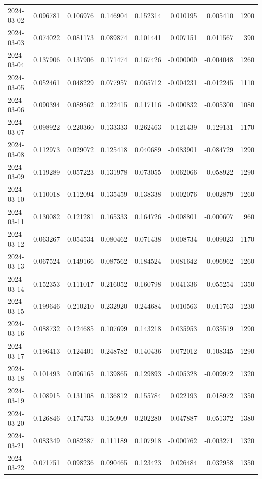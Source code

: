 \begin{tabular}{lrrrrrrr}
2024-03-02 & 0.096781 & 0.106976 & 0.146904 & 0.152314 & 0.010195 & 0.005410 & 1200 \\
2024-03-03 & 0.074022 & 0.081173 & 0.089874 & 0.101441 & 0.007151 & 0.011567 & 390 \\
2024-03-04 & 0.137906 & 0.137906 & 0.171474 & 0.167426 & -0.000000 & -0.004048 & 1260 \\
2024-03-05 & 0.052461 & 0.048229 & 0.077957 & 0.065712 & -0.004231 & -0.012245 & 1110 \\
2024-03-06 & 0.090394 & 0.089562 & 0.122415 & 0.117116 & -0.000832 & -0.005300 & 1080 \\
2024-03-07 & 0.098922 & 0.220360 & 0.133333 & 0.262463 & 0.121439 & 0.129131 & 1170 \\
2024-03-08 & 0.112973 & 0.029072 & 0.125418 & 0.040689 & -0.083901 & -0.084729 & 1290 \\
2024-03-09 & 0.119289 & 0.057223 & 0.131978 & 0.073055 & -0.062066 & -0.058922 & 1290 \\
2024-03-10 & 0.110018 & 0.112094 & 0.135459 & 0.138338 & 0.002076 & 0.002879 & 1260 \\
2024-03-11 & 0.130082 & 0.121281 & 0.165333 & 0.164726 & -0.008801 & -0.000607 & 960 \\
2024-03-12 & 0.063267 & 0.054534 & 0.080462 & 0.071438 & -0.008734 & -0.009023 & 1170 \\
2024-03-13 & 0.067524 & 0.149166 & 0.087562 & 0.184524 & 0.081642 & 0.096962 & 1260 \\
2024-03-14 & 0.152353 & 0.111017 & 0.216052 & 0.160798 & -0.041336 & -0.055254 & 1350 \\
2024-03-15 & 0.199646 & 0.210210 & 0.232920 & 0.244684 & 0.010563 & 0.011763 & 1230 \\
2024-03-16 & 0.088732 & 0.124685 & 0.107699 & 0.143218 & 0.035953 & 0.035519 & 1290 \\
2024-03-17 & 0.196413 & 0.124401 & 0.248782 & 0.140436 & -0.072012 & -0.108345 & 1290 \\
2024-03-18 & 0.101493 & 0.096165 & 0.139865 & 0.129893 & -0.005328 & -0.009972 & 1320 \\
2024-03-19 & 0.108915 & 0.131108 & 0.136812 & 0.155784 & 0.022193 & 0.018972 & 1350 \\
2024-03-20 & 0.126846 & 0.174733 & 0.150909 & 0.202280 & 0.047887 & 0.051372 & 1380 \\
2024-03-21 & 0.083349 & 0.082587 & 0.111189 & 0.107918 & -0.000762 & -0.003271 & 1320 \\
2024-03-22 & 0.071751 & 0.098236 & 0.090465 & 0.123423 & 0.026484 & 0.032958 & 1350 \\

\end{tabular}
